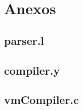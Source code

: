 \documentclass[a4paper,10pt]{report}
\begin{document}
\chapter{Anexos}
\section{parser.l}

\section{compiler.y}

\section{vmCompiler.c}

\end{document}
